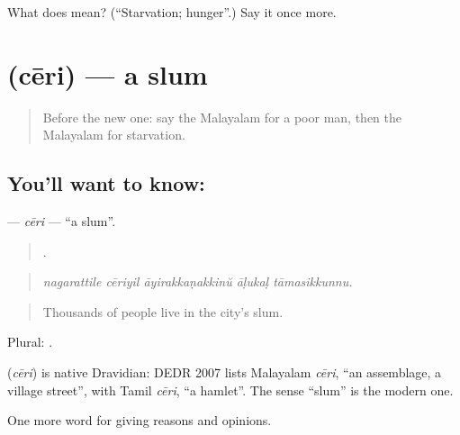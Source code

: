 \begin{tcolorbox}[breakable,colback=teal!4,colframe=teal!35!black,title={Before you move on}]
What does  mean? (\textquotedblleft{}Starvation; hunger\textquotedblright{}.) Say it once more.
\end{tcolorbox}
\section[\texorpdfstring{\ml{ചേരി} (cēri)}{ചേരി (cēri)}]{ (cēri) — a slum}

\label{lesson:ML-C427-ceri}



\begin{quote}
Before the new one: say the Malayalam for a poor man, then the Malayalam for starvation.
\end{quote}

\subsection*{You'll want to know: }
\textbf{} — \emph{cēri} — \textquotedblleft{}a slum\textquotedblright{}.

\begin{quote}
    .
\end{quote}

\begin{quote}
\emph{nagarattile cēriyil āyirakkaṇakkinŭ āḷukaḷ tāmasikkunnu.}
\end{quote}

\begin{quote}
Thousands of people live in the city's slum.
\end{quote}

Plural: .

\begin{cousinweb}
\textbf{} (\emph{cēri}) is native Dravidian: DEDR 2007 lists Malayalam \emph{cēri}, \textquotedblleft{}an assemblage, a village street\textquotedblright{}, with Tamil \emph{cēri}, \textquotedblleft{}a hamlet\textquotedblright{}. The sense \textquotedblleft{}slum\textquotedblright{} is the modern one.
\end{cousinweb}

\begin{grammarlens}[title={What you've built}]
One more word for giving reasons and opinions.
\end{grammarlens}

